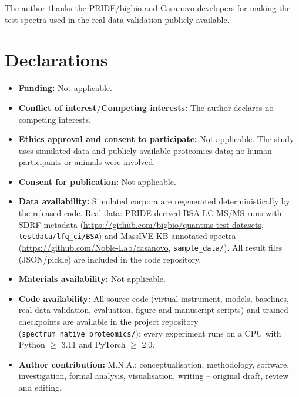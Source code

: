 \documentclass[pdflatex,sn-mathphys-num]{sn-jnl}
\begin{document}
\backmatter

The author thanks the PRIDE/bigbio and Casanovo developers for making the test spectra used in the real-data validation publicly available.

\section*{Declarations}

\begin{itemize}
\item \textbf{Funding:} Not applicable.
\item \textbf{Conflict of interest/Competing interests:} The author declares no competing interests.
\item \textbf{Ethics approval and consent to participate:} Not applicable. The study uses simulated data and publicly available proteomics data; no human participants or animals were involved.
\item \textbf{Consent for publication:} Not applicable.
\item \textbf{Data availability:} Simulated corpora are regenerated deterministically by the released code. Real data: PRIDE-derived BSA LC-MS/MS runs with SDRF metadata (\url{https://github.com/bigbio/quantms-test-datasets}, \texttt{testdata/lfq\_ci/BSA}) and MassIVE-KB annotated spectra (\url{https://github.com/Noble-Lab/casanovo}, \texttt{sample\_data/}). All result files (JSON/pickle) are included in the code repository.
\item \textbf{Materials availability:} Not applicable.
\item \textbf{Code availability:} All source code (virtual instrument, models, baselines, real-data validation, evaluation, figure and manuscript scripts) and trained checkpoints are available in the project repository (\texttt{spectrum\_native\_proteomics/}); every experiment runs on a CPU with Python $\geq$ 3.11 and PyTorch $\geq$ 2.0.
\item \textbf{Author contribution:} M.N.A.: conceptualisation, methodology, software, investigation, formal analysis, visualisation, writing -- original draft, review and editing.
\end{itemize}


\end{document}
